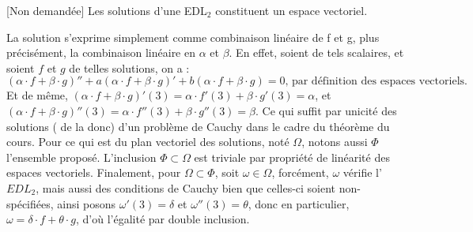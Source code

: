 \documentclass{article}
\begin{document}
\begin{question_kholle}[
    Soient $(a,b)\in \mathbb{C}^2$, $f$ et $g$ les  solutions, définies sur $\mathbb{R}$ à valeurs
    dans $\mathbb{C}$, des problèmes de Cauchy suivants :
    \[
      \left\{ \begin{array}{cl}
        y'' +ay'+by = 0 \\
        y(3) = 1        \\
        y'(3) = 0
      \end{array} \right.
      \quad \text{et} \quad
      \left\{ \begin{array}{cl}
        y'' +ay'+by = 0 \\
        y(3) = 0        \\
        y'(3) = 1
      \end{array} \right.
    \]

    Comment s'exprime la solution définie sur $\mathbb{R}$ de $\left\{ \begin{array}{cl}
        y'' +ay'+by = 0 \\
        y(3) = \alpha   \\
        y'(3) = \beta
      \end{array} \right. $ pour $(\alpha, \beta)\in \mathbb{R}^2$ fixés ?

    Peut-on affirmer que le plan vectoriel des solutions définies sur $\mathbb{R}$ à valeurs dans
    $\mathbb{C}$ de $y'' + ay' + by = 0$ est $\{ \lambda \cdot f + \mu \cdot g  |
      (\lambda, \mu)\in \mathbb{C}^2\}$
  ]
  {[Non demandée] Les solutions d'une EDL$_2$ constituent un espace vectoriel.}

  La solution s'exprime simplement comme combinaison linéaire de f et g, plus précisément, la
  combinaison linéaire en $\alpha$ et $\beta$. En effet, soient de tels scalaires, et soient $f$ et
  $g$ de telles solutions, on a :
  \[
    (\alpha \cdot f + \beta \cdot g)'' + a (\alpha \cdot f + \beta \cdot g)' + b (\alpha \cdot f +
    \beta \cdot g) = 0 \text{, par définition des espaces vectoriels.}
  \]
  Et de même, $(\alpha \cdot f + \beta \cdot g)'(3) = \alpha \cdot f'(3) + \beta \cdot g'(3) = \alpha$,
  et $(\alpha \cdot f + \beta \cdot g)''(3) = \alpha \cdot f''(3) + \beta \cdot g''(3) = \beta$.
  \newline
  Ce qui suffit par unicité des solutions ( de la donc) d'un problème de Cauchy dans le cadre du
  théorème du cours.
  \newline
  Pour ce qui est du plan vectoriel des solutions, noté $\Omega$, notons aussi $\Phi$ l'ensemble proposé.
  L'inclusion $\Phi \subset \Omega$ est triviale par propriété de linéarité des espaces vectoriels.
  Finalement, pour $\Omega \subset \Phi$, soit $\omega \in \Omega$, forcément, $\omega$ vérifie
  l'$EDL_2$, mais aussi des conditions de Cauchy bien que celles-ci soient non-spécifiées, ainsi
  posons $\omega'(3) = \delta$ et $\omega''(3) = \theta$, donc en particulier, $ \omega =
    \delta \cdot f + \theta \cdot g$, d'où l'égalité par double inclusion.
\end{question_kholle}
\end{document}

